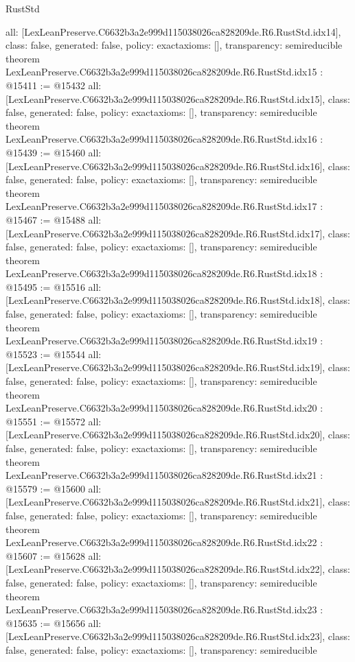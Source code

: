 \begin{lexlean}{RustStd}
\begin{coremodule}
{  all: [LexLeanPreserve.C6632b3a2e999d115038026ca828209de.R6.RustStd.idx14],
  class: false,
  generated: false,
  policy: exact{axioms: []},
  transparency: semireducible
}
theorem LexLeanPreserve.C6632b3a2e999d115038026ca828209de.R6.RustStd.idx15 : @15411 := @15432 {
  all: [LexLeanPreserve.C6632b3a2e999d115038026ca828209de.R6.RustStd.idx15],
  class: false,
  generated: false,
  policy: exact{axioms: []},
  transparency: semireducible
}
theorem LexLeanPreserve.C6632b3a2e999d115038026ca828209de.R6.RustStd.idx16 : @15439 := @15460 {
  all: [LexLeanPreserve.C6632b3a2e999d115038026ca828209de.R6.RustStd.idx16],
  class: false,
  generated: false,
  policy: exact{axioms: []},
  transparency: semireducible
}
theorem LexLeanPreserve.C6632b3a2e999d115038026ca828209de.R6.RustStd.idx17 : @15467 := @15488 {
  all: [LexLeanPreserve.C6632b3a2e999d115038026ca828209de.R6.RustStd.idx17],
  class: false,
  generated: false,
  policy: exact{axioms: []},
  transparency: semireducible
}
theorem LexLeanPreserve.C6632b3a2e999d115038026ca828209de.R6.RustStd.idx18 : @15495 := @15516 {
  all: [LexLeanPreserve.C6632b3a2e999d115038026ca828209de.R6.RustStd.idx18],
  class: false,
  generated: false,
  policy: exact{axioms: []},
  transparency: semireducible
}
theorem LexLeanPreserve.C6632b3a2e999d115038026ca828209de.R6.RustStd.idx19 : @15523 := @15544 {
  all: [LexLeanPreserve.C6632b3a2e999d115038026ca828209de.R6.RustStd.idx19],
  class: false,
  generated: false,
  policy: exact{axioms: []},
  transparency: semireducible
}
theorem LexLeanPreserve.C6632b3a2e999d115038026ca828209de.R6.RustStd.idx20 : @15551 := @15572 {
  all: [LexLeanPreserve.C6632b3a2e999d115038026ca828209de.R6.RustStd.idx20],
  class: false,
  generated: false,
  policy: exact{axioms: []},
  transparency: semireducible
}
theorem LexLeanPreserve.C6632b3a2e999d115038026ca828209de.R6.RustStd.idx21 : @15579 := @15600 {
  all: [LexLeanPreserve.C6632b3a2e999d115038026ca828209de.R6.RustStd.idx21],
  class: false,
  generated: false,
  policy: exact{axioms: []},
  transparency: semireducible
}
theorem LexLeanPreserve.C6632b3a2e999d115038026ca828209de.R6.RustStd.idx22 : @15607 := @15628 {
  all: [LexLeanPreserve.C6632b3a2e999d115038026ca828209de.R6.RustStd.idx22],
  class: false,
  generated: false,
  policy: exact{axioms: []},
  transparency: semireducible
}
theorem LexLeanPreserve.C6632b3a2e999d115038026ca828209de.R6.RustStd.idx23 : @15635 := @15656 {
  all: [LexLeanPreserve.C6632b3a2e999d115038026ca828209de.R6.RustStd.idx23],
  class: false,
  generated: false,
  policy: exact{axioms: []},
  transparency: semireducible
}
\end{coremodule}
\end{lexlean}
